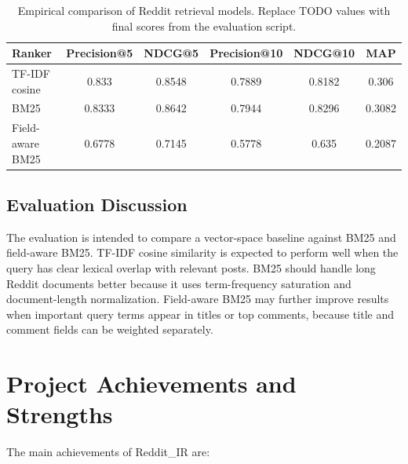 \documentclass[11pt]{article}
\begin{document}
\begin{table}[H]
\centering
\begin{tabular}{lccccc}
\toprule
\textbf{Ranker} & \textbf{Precision@5} & \textbf{NDCG@5} & \textbf{Precision@10} & \textbf{NDCG@10} & \textbf{MAP} \\
\midrule
TF-IDF cosine & 0.833 & 0.8548 & 0.7889 & 0.8182 & 0.306 \\
BM25 & 0.8333 & 0.8642 & 0.7944 & 0.8296 & 0.3082 \\
Field-aware BM25 & 0.6778 & 0.7145 & 0.5778 & 0.635 & 0.2087 \\
\bottomrule
\end{tabular}
\caption{Empirical comparison of Reddit retrieval models. Replace TODO values with final scores from the evaluation script.}
\label{tab:evaluation}
\end{table}

\subsection{Evaluation Discussion}
The evaluation is intended to compare a vector-space baseline against BM25 and field-aware BM25. TF-IDF cosine similarity is expected to perform well when the query has clear lexical overlap with relevant posts. BM25 should handle long Reddit documents better because it uses term-frequency saturation and document-length normalization. Field-aware BM25 may further improve results when important query terms appear in titles or top comments, because title and comment fields can be weighted separately.

\section{Project Achievements and Strengths}
The main achievements of Reddit\_IR are:
\end{document}
